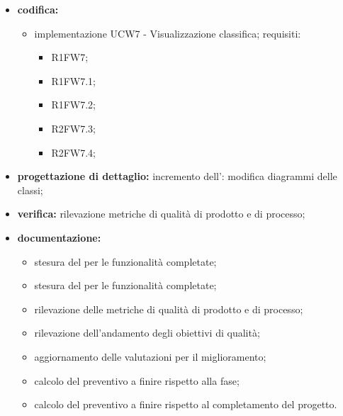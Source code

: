\begin{itemize}
	\item \textbf{codifica:} 
			\begin{itemize}
				\item implementazione UCW7 - Visualizzazione classifica; requisiti:
					\begin{itemize}
						\item R1FW7;
						\item R1FW7.1;
						\item R1FW7.2;
						\item R2FW7.3;
						\item R2FW7.4;
					\end{itemize}
			\end{itemize}
	\item \textbf{progettazione di dettaglio:} incremento dell’{\SA}: modifica diagrammi delle classi;
 	\item \textbf{verifica:} rilevazione metriche di qualità di prodotto e di processo;
	\item \textbf{documentazione:} 
	 \begin{itemize}
		\item stesura del \MU{} per le funzionalità completate;
		\item stesura del \MA{} per le funzionalità completate;
     	\item rilevazione delle metriche di qualità di prodotto e di processo;
     	\item rilevazione dell’andamento degli obiettivi di qualità;
		\item aggiornamento delle valutazioni per il miglioramento; 
		\item calcolo del preventivo a finire rispetto alla fase;
		\item calcolo del preventivo a finire rispetto al completamento del progetto.
	 \end{itemize}
\end{itemize}

\pagebreak

